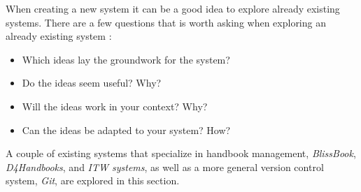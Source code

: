 When creating a new system it can be a good idea to explore already existing systems.
There are a few questions that is worth asking when exploring an already existing system \citep[p.~33]{Rod-Aalborg}:

\begin{itemize}
  \item Which ideas lay the groundwork for the system?
  \item Do the ideas seem useful? Why?
  \item Will the ideas work in your context? Why?
  \item Can the ideas be adapted to your system? How?
\end{itemize}


A couple of existing systems that specialize in handbook management, \textit{BlissBook}, \textit{D4Handbooks}, and \textit{ITW systems}, as well as a more general version control system, \textit{Git}, are explored in this section.